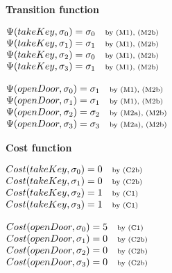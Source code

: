 \documentclass[11pt]{article}
\makeatletter
\newcommand{\exampleblocktitle}[1]{\par\medskip\noindent\textbf{#1}\par\smallskip}
\newcommand{\byrule}[1]{\quad \text{\scriptsize by #1}}
\newenvironment{statementblock}
{\begin{flushleft}\renewcommand{\arraystretch}{1.1}\(\begin{array}{@{}l@{}}}
{\end{array}\)\end{flushleft}}
\makeatother
\begin{document}
\exampleblocktitle{Transition function}
\noindent
\begin{minipage}[t]{0.47\textwidth}
\begin{statementblock}
\Psi(takeKey, \sigma_0) = \sigma_0 \byrule{(M1), (M2b)} \\
\Psi(takeKey, \sigma_1) = \sigma_1 \byrule{(M1), (M2b)} \\
\Psi(takeKey, \sigma_2) = \sigma_0 \byrule{(M1), (M2b)} \\
\Psi(takeKey, \sigma_3) = \sigma_1 \byrule{(M1), (M2b)}
\end{statementblock}
\end{minipage}
\hfill
\begin{minipage}[t]{0.47\textwidth}
\begin{statementblock}
\Psi(openDoor, \sigma_0) = \sigma_1 \byrule{(M1), (M2b)} \\
\Psi(openDoor, \sigma_1) = \sigma_1 \byrule{(M1), (M2b)} \\
\Psi(openDoor, \sigma_2) = \sigma_2 \byrule{(M2a), (M2b)} \\
\Psi(openDoor, \sigma_3) = \sigma_3 \byrule{(M2a), (M2b)}
\end{statementblock}
\end{minipage}

\exampleblocktitle{Cost function}
\noindent
\begin{minipage}[t]{0.47\textwidth}
\begin{statementblock}
Cost(takeKey, \sigma_0) = 0 \byrule{(C2b)} \\
Cost(takeKey, \sigma_1) = 0 \byrule{(C2b)} \\
Cost(takeKey, \sigma_2) = 1 \byrule{(C1)} \\
Cost(takeKey, \sigma_3) = 1 \byrule{(C1)}
\end{statementblock}
\end{minipage}
\hfill
\begin{minipage}[t]{0.47\textwidth}
\begin{statementblock}
Cost(openDoor, \sigma_0) = 5 \byrule{(C1)} \\
Cost(openDoor, \sigma_1) = 0 \byrule{(C2b)} \\
Cost(openDoor, \sigma_2) = 0 \byrule{(C2b)} \\
Cost(openDoor, \sigma_3) = 0 \byrule{(C2b)}
\end{statementblock}
\end{minipage}
\end{document}
